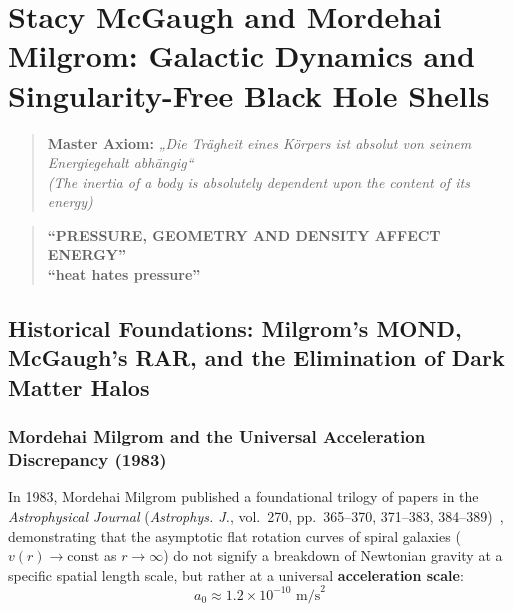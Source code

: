 \documentclass[11pt,a4paper]{article}
\begin{document}

\section{Stacy McGaugh and Mordehai Milgrom: Galactic Dynamics and Singularity-Free Black Hole Shells}
\label{sec:mcgaugh_milgrom}

\begin{quote}
\centering
\textbf{Master Axiom:} \textit{„Die Trägheit eines Körpers ist absolut von seinem Energiegehalt abhängig“}\\
\textit{(The inertia of a body is absolutely dependent upon the content of its energy)}
\end{quote}

\begin{quote}
\centering
\textbf{``PRESSURE, GEOMETRY AND DENSITY AFFECT ENERGY''}\\
\textbf{``heat hates pressure''}
\end{quote}

\subsection{Historical Foundations: Milgrom's MOND, McGaugh's RAR, and the Elimination of Dark Matter Halos}
\label{subsec:rar_foundations}

\subsubsection{Mordehai Milgrom and the Universal Acceleration Discrepancy (1983)}
\label{subsubsec:milgrom_1983}

In 1983, Mordehai Milgrom published a foundational trilogy of papers in the \textit{Astrophysical Journal} (\textit{Astrophys. J.}, vol.~270, pp.~365--370, 371--383, 384--389)~\cite{Milgrom1983a,Milgrom1983b,Milgrom1983c}, demonstrating that the asymptotic flat rotation curves of spiral galaxies ($v(r) \to \text{const}$ as $r \to \infty$) do not signify a breakdown of Newtonian gravity at a specific spatial length scale, but rather at a universal \textbf{acceleration scale}:
\begin{equation}
a_0 \approx 1.2 \times 10^{-10}\text{ m/s}^2
\label{eq:milgrom_a0_empirical}
\end{equation}
\end{document}
